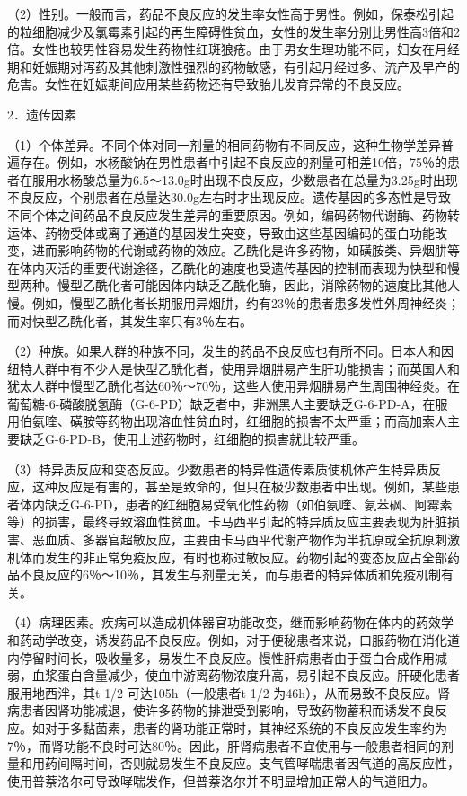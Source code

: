 （2）性别。一般而言，药品不良反应的发生率女性高于男性。例如，保泰松引起的粒细胞减少及氯霉素引起的再生障碍性贫血，女性的发生率分别比男性高3倍和2倍。女性也较男性容易发生药物性红斑狼疮。由于男女生理功能不同，妇女在月经期和妊娠期对泻药及其他刺激性强烈的药物敏感，有引起月经过多、流产及早产的危害。女性在妊娠期间应用某些药物还有导致胎儿发育异常的不良反应。

2．遗传因素

（1）个体差异。不同个体对同一剂量的相同药物有不同反应，这种生物学差异普遍存在。例如，水杨酸钠在男性患者中引起不良反应的剂量可相差10倍，75％的患者在服用水杨酸总量为6.5～13.0g时出现不良反应，少数患者在总量为3.25g时出现不良反应，个别患者在总量达30.0g左右时才出现反应。遗传基因的多态性是导致不同个体之间药品不良反应发生差异的重要原因。例如，编码药物代谢酶、药物转运体、药物受体或离子通道的基因发生突变，导致由这些基因编码的蛋白功能改变，进而影响药物的代谢或药物的效应。乙酰化是许多药物，如磺胺类、异烟肼等在体内灭活的重要代谢途径，乙酰化的速度也受遗传基因的控制而表现为快型和慢型两种。慢型乙酰化者可能因体内缺乏乙酰化酶，因此，消除药物的速度比其他人慢。例如，慢型乙酰化者长期服用异烟肼，约有23％的患者患多发性外周神经炎；而对快型乙酰化者，其发生率只有3％左右。

（2）种族。如果人群的种族不同，发生的药品不良反应也有所不同。日本人和因纽特人群中有不少人是快型乙酰化者，使用异烟肼易产生肝功能损害；而英国人和犹太人群中慢型乙酰化者达60％～70％，这些人使用异烟肼易产生周围神经炎。在葡萄糖-6-磷酸脱氢酶（G-6-PD）缺乏者中，非洲黑人主要缺乏G-6-PD-A，在服用伯氨喹、磺胺等药物出现溶血性贫血时，红细胞的损害不太严重；而高加索人主要缺乏G-6-PD-B，使用上述药物时，红细胞的损害就比较严重。

（3）特异质反应和变态反应。少数患者的特异性遗传素质使机体产生特异质反应，这种反应是有害的，甚至是致命的，但只在极少数患者中出现。例如，某些患者体内缺乏G-6-PD，患者的红细胞易受氧化性药物（如伯氨喹、氨苯砜、阿霉素等）的损害，最终导致溶血性贫血。卡马西平引起的特异质反应主要表现为肝脏损害、恶血质、多器官超敏反应，主要由卡马西平代谢产物作为半抗原或全抗原刺激机体而发生的非正常免疫反应，有时也称过敏反应。药物引起的变态反应占全部药品不良反应的6％～10％，其发生与剂量无关，而与患者的特异体质和免疫机制有关。

（4）病理因素。疾病可以造成机体器官功能改变，继而影响药物在体内的药效学和药动学改变，诱发药品不良反应。例如，对于便秘患者来说，口服药物在消化道内停留时间长，吸收量多，易发生不良反应。慢性肝病患者由于蛋白合成作用减弱，血浆蛋白含量减少，使血中游离药物浓度升高，易引起不良反应。肝硬化患者服用地西泮，其{t}
{1/2} 可达105h（一般患者{t} {1/2}
为46h），从而易致不良反应。肾病患者因肾功能减退，使许多药物的排泄受到影响，导致药物蓄积而诱发不良反应。如对于多黏菌素，患者的肾功能正常时，其神经系统的不良反应发生率约为7％，而肾功能不良时可达80％。因此，肝肾病患者不宜使用与一般患者相同的剂量和用药间隔时间，否则就易发生不良反应。支气管哮喘患者因气道的高反应性，使用普萘洛尔可导致哮喘发作，但普萘洛尔并不明显增加正常人的气道阻力。

